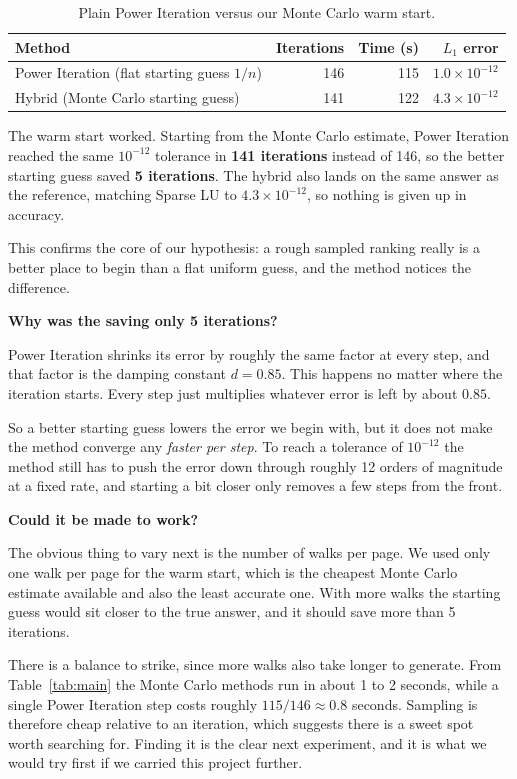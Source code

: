 \documentclass[11pt,a4paper]{article}
\begin{document}
\begin{table}[H]
\centering
\caption{Plain Power Iteration versus our Monte Carlo warm start.}
\begin{tabular}{lrrr}
\toprule
\textbf{Method} & \textbf{Iterations} & \textbf{Time (s)} & \textbf{$L_1$ error} \\
\midrule
Power Iteration (flat starting guess $1/n$) & 146 & 115 & $1.0\times10^{-12}$ \\
Hybrid (Monte Carlo starting guess)         & 141 & 122 & $4.3\times10^{-12}$ \\
\bottomrule
\end{tabular}
\end{table}

The warm start worked. Starting from the Monte Carlo estimate, Power Iteration
reached the same $10^{-12}$ tolerance in \textbf{141 iterations} instead of 146, so the
better starting guess saved \textbf{5 iterations}. The hybrid also lands on the same
answer as the reference, matching Sparse LU to $4.3\times10^{-12}$, so nothing is given
up in accuracy.

This confirms the core of our hypothesis: a rough sampled ranking really is a better
place to begin than a flat uniform guess, and the method notices the difference.

\medskip
\noindent\textbf{Why was the saving only 5 iterations?}

Power Iteration shrinks its error by roughly the same factor at every step, and that
factor is the damping constant $d = 0.85$. This happens no matter where the iteration
starts. Every step just multiplies whatever error is left by about $0.85$.

So a better starting guess lowers the error we begin with, but it does not make the
method converge any \emph{faster per step}. To reach a tolerance of $10^{-12}$ the
method still has to push the error down through roughly 12 orders of magnitude at a
fixed rate, and starting a bit closer only removes a few steps from the front.

\medskip
\noindent\textbf{Could it be made to work?}

The obvious thing to vary next is the number of walks per page. We used only one walk
per page for the warm start, which is the cheapest Monte Carlo estimate available and
also the least accurate one. With more walks the starting guess would sit closer to
the true answer, and it should save more than 5 iterations.

There is a balance to strike, since more walks also take longer to generate. From
Table~\ref{tab:main} the Monte Carlo methods run in about 1 to 2 seconds, while a
single Power Iteration step costs roughly $115/146 \approx 0.8$ seconds. Sampling is
therefore cheap relative to an iteration, which suggests there is a sweet spot worth
searching for. Finding it is the clear next experiment, and it is what we would try
first if we carried this project further.
\end{document}
